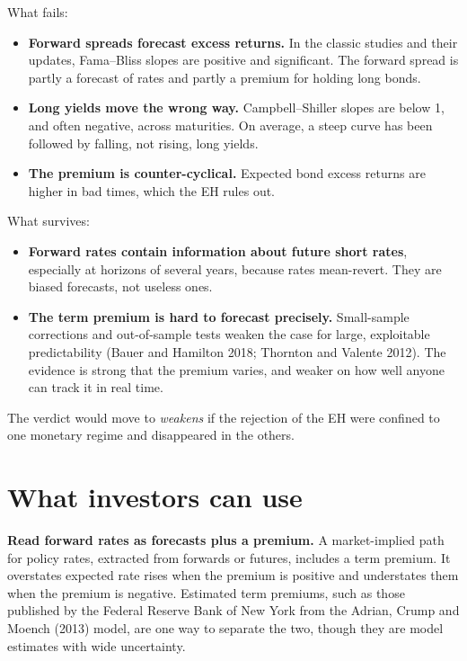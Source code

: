 What fails:

\begin{itemize}
  \item \textbf{Forward spreads forecast excess returns.} In the classic studies and their updates, Fama--Bliss slopes are positive and significant. The forward spread is partly a forecast of rates and partly a premium for holding long bonds.
  \item \textbf{Long yields move the wrong way.} Campbell--Shiller slopes are below 1, and often negative, across maturities. On average, a steep curve has been followed by falling, not rising, long yields.
  \item \textbf{The premium is counter-cyclical.} Expected bond excess returns are higher in bad times, which the EH rules out.
\end{itemize}

What survives:

\begin{itemize}
  \item \textbf{Forward rates contain information about future short rates}, especially at horizons of several years, because rates mean-revert. They are biased forecasts, not useless ones.
  \item \textbf{The term premium is hard to forecast precisely.} Small-sample corrections and out-of-sample tests weaken the case for large, exploitable predictability (Bauer and Hamilton 2018; Thornton and Valente 2012). The evidence is strong that the premium varies, and weaker on how well anyone can track it in real time.
\end{itemize}

The verdict would move to \emph{weakens} if the rejection of the EH were confined to one monetary regime and disappeared in the others.

\section{What investors can use}
\label{sec:16-investors}

\textbf{Read forward rates as forecasts plus a premium.} A market-implied path for policy rates, extracted from forwards or futures, includes a term premium. It overstates expected rate rises when the premium is positive and understates them when the premium is negative. Estimated term premiums, such as those published by the Federal Reserve Bank of New York from the Adrian, Crump and Moench (2013) model, are one way to separate the two, though they are model estimates with wide uncertainty.

